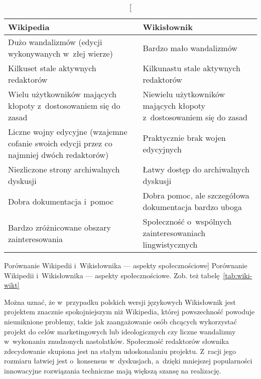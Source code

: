 \begin{table}[h]
\begin{center}
	\begin{tabularx}{\textwidth}{ XX }
		\toprule \textbf{Wikipedia} & \textbf{Wikisłownik} \\
		\midrule Dużo wandalizmów (edycji wykonywanych w~złej wierze)
			& Bardzo mało wandalizmów \\
		\midrule Kilkuset stale aktywnych redaktorów
			& Kilkunastu stale aktywnych redaktorów \\
		\midrule Wielu użytkowników mających kłopoty z~dostosowaniem się do zasad
			& Niewielu użytkowników mających kłopoty z~dostosowaniem się do zasad \\
		\midrule Liczne wojny edycyjne (wzajemne cofanie swoich edycji przez co najmniej dwóch redaktorów)
			& Praktycznie brak wojen edycyjnych \\
		\midrule Niezliczone strony archiwalnych dyskusji
			& Łatwy dostęp do archiwalnych dyskusji \\
		\midrule Dobra dokumentacja i~pomoc
			& Dobra pomoc, ale szczegółowa dokumentacja bardzo uboga \\
		\midrule Bardzo zróżnicowane obszary zainteresowania
			& Społeczność o~wspólnych zainteresowaniach lingwistycznych \\
		\bottomrule
	\end{tabularx}
\caption
	[Porównanie Wikipedii i~Wikisłownika --- aspekty społecznościowe]
	{Porównanie Wikipedii i~Wikisłownika --- aspekty społecznościowe. Zob. też tabelę~\ref{tab:wiki-wikt}}
\label{tab:wiki-wikt2}
\end{center}
\end{table}
Można uznać, że w~przypadku polskich wersji językowych Wikisłownik jest projektem znacznie spokojniejszym niż Wikipedia, której powszechność powoduje nieuniknione problemy, takie jak zaangażowanie osób chcących wykorzystać projekt do celów marketingowych lub ideologicznych czy liczne wandalizmy w~wykonaniu znudzonych nastolatków. Społeczność redaktorów słownika zdecydowanie skupiona jest na stałym udoskonalaniu projektu. Z~racji jego rozmiaru łatwiej jest o~konsensus w~dyskusjach, a~dzięki mniejszej popularności innowacyjne rozwiązania techniczne mają większą szansę na realizację.


